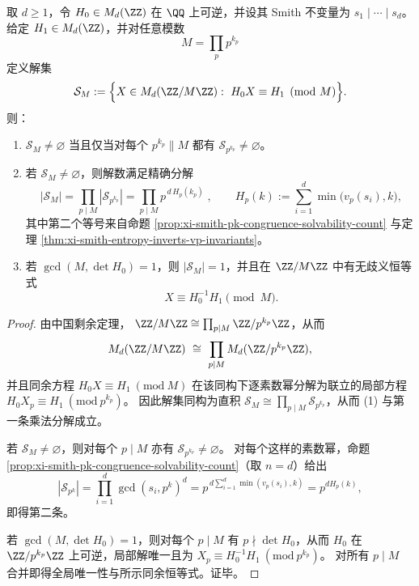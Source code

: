 \begin{theorem}\label{thm:xi-hankel-normalform-crt-adelic-multiplicity}
取 \(d\ge 1\)，令 \(H_0\in M_d(\ZZ)\) 在 \(\QQ\) 上可逆，并设其 Smith 不变量为 \(s_1\mid\cdots\mid s_d\)。
给定 \(H_1\in M_d(\ZZ)\)，并对任意模数
\[
M=\prod_{p}p^{k_p}
\]
定义解集
\[
\mathcal S_M:=\Bigl\{X\in M_d(\ZZ/M\ZZ):\ H_0X\equiv H_1\pmod M\Bigr\}.
\]
则：
\begin{enumerate}
  \item \(\mathcal S_M\neq\varnothing\) 当且仅当对每个 \(p^{k_p}\parallel M\) 都有 \(\mathcal S_{p^{k_p}}\neq\varnothing\)。
  \item 若 \(\mathcal S_M\neq\varnothing\)，则解数满足精确分解
  \[
  \boxed{\;
  |\mathcal S_M|
  =\prod_{p\mid M}|\mathcal S_{p^{k_p}}|
  =\prod_{p\mid M}p^{\,d\,H_p(k_p)}\;},
  \qquad
  H_p(k):=\sum_{i=1}^{d}\min\bigl(v_p(s_i),k\bigr),
  \]
  其中第二个等号来自命题 \ref{prop:xi-smith-pk-congruence-solvability-count} 与定理 \ref{thm:xi-smith-entropy-inverts-vp-invariants}。
  \item 若 \(\gcd(M,\det H_0)=1\)，则 \(|\mathcal S_M|=1\)，并且在 \(\ZZ/M\ZZ\) 中有无歧义恒等式
  \[
  \boxed{\;X\equiv H_0^{-1}H_1\pmod M.}
  \]
\end{enumerate}
\end{theorem}
\begin{proof}
由中国剩余定理，
\(
\ZZ/M\ZZ\cong \prod_{p\mid M}\ZZ/p^{k_p}\ZZ
\)，从而
\[
M_d(\ZZ/M\ZZ)\ \cong\ \prod_{p\mid M} M_d(\ZZ/p^{k_p}\ZZ),
\]
并且同余方程 \(H_0X\equiv H_1\ (\mathrm{mod}\ M)\) 在该同构下逐素数幂分解为联立的局部方程
\(
H_0X_p\equiv H_1\ (\mathrm{mod}\ p^{k_p})
\)。
因此解集同构为直积
\(
\mathcal S_M\cong \prod_{p\mid M}\mathcal S_{p^{k_p}}
\)，从而 (1) 与第一条乘法分解成立。
\par
若 \(\mathcal S_M\neq\varnothing\)，则对每个 \(p\mid M\) 亦有 \(\mathcal S_{p^{k_p}}\neq\varnothing\)。
对每个这样的素数幂，命题 \ref{prop:xi-smith-pk-congruence-solvability-count}（取 \(n=d\)）给出
\[
|\mathcal S_{p^{k}}|
=\prod_{i=1}^{d}\gcd(s_i,p^{k})^{d}
=p^{\,d\sum_{i=1}^{d}\min(v_p(s_i),k)}
=p^{dH_p(k)},
\]
即得第二条。
\par
若 \(\gcd(M,\det H_0)=1\)，则对每个 \(p\mid M\) 有 \(p\nmid \det H_0\)，从而 \(H_0\) 在 \(\ZZ/p^{k_p}\ZZ\) 上可逆，局部解唯一且为 \(X_p\equiv H_0^{-1}H_1\ (\mathrm{mod}\ p^{k_p})\)。
对所有 \(p\mid M\) 合并即得全局唯一性与所示同余恒等式。证毕。
\end{proof}

